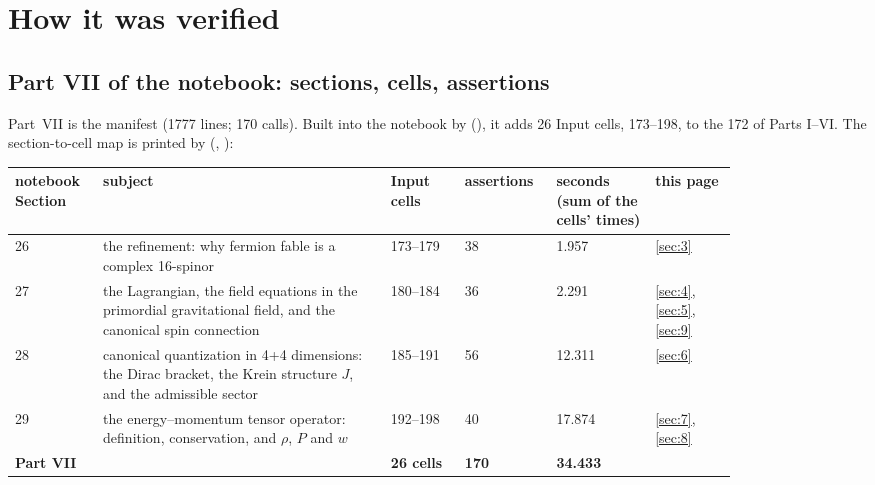 \section{How it was verified}
\label{sec:10}

\subsection{Part VII of the notebook: sections, cells, assertions}
\label{sec:10.1}

Part~VII is the manifest  (1777 lines; 170  calls).
Built into the notebook by  (), it adds 26 Input
cells, 173--198, to the 172 of Parts I--VI. The section-to-cell map is printed by
 (, ):

{\small
\begin{longtable}{@{}p{0.09\linewidth}p{0.35\linewidth}p{0.09\linewidth}p{0.09\linewidth}p{0.12\linewidth}p{0.1\linewidth}@{}}
\toprule
\raggedright notebook Section & \raggedright subject & \raggedright Input cells & \raggedright assertions & \raggedright seconds (sum of the cells' times) & \raggedright this page \tabularnewline
\midrule
\endhead
\raggedright 26 & \raggedright the refinement: why fermion fable is a complex 16-spinor & \raggedright 173--179 & \raggedright 38 & \raggedright 1.957 & \raggedright \ref{sec:3} \tabularnewline
\raggedright 27 & \raggedright the Lagrangian, the field equations in the primordial gravitational field, and the canonical spin connection & \raggedright 180--184 & \raggedright 36 & \raggedright 2.291 & \raggedright \ref{sec:4}, \ref{sec:5}, \ref{sec:9} \tabularnewline
\raggedright 28 & \raggedright canonical quantization in 4+4 dimensions: the Dirac bracket, the Krein structure $J$, and the admissible sector & \raggedright 185--191 & \raggedright 56 & \raggedright 12.311 & \raggedright \ref{sec:6} \tabularnewline
\raggedright 29 & \raggedright the energy--momentum tensor operator: definition, conservation, and $\rho$, $P$ and $w$ & \raggedright 192--198 & \raggedright 40 & \raggedright 17.874 & \raggedright \ref{sec:7}, \ref{sec:8} \tabularnewline
\midrule
\raggedright \textbf{Part VII} & & \raggedright \textbf{26 cells} & \raggedright \textbf{170} & \raggedright \textbf{34.433} & \tabularnewline
\bottomrule
\end{longtable}
}

